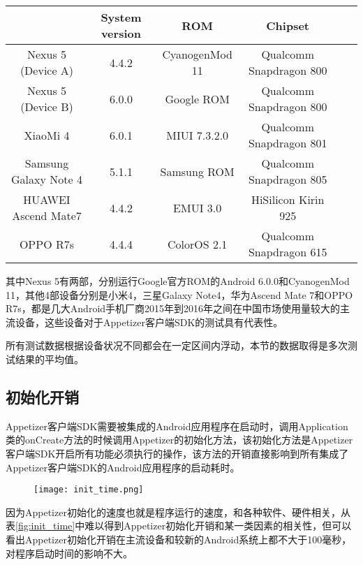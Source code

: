 \begin{table}[!hpb]
	\centering
	\begin{tabular}{c c c c c c} \toprule
		& System version & ROM & Chipset \\ \midrule
		Nexus 5 (Device A) & 4.4.2 & CyanogenMod 11 & Qualcomm Snapdragon 800 \\
		Nexus 5 (Device B) & 6.0.0 & Google ROM & Qualcomm Snapdragon 800 \\
		XiaoMi 4 & 6.0.1 & MIUI 7.3.2.0  & Qualcomm Snapdragon 801 \\
		Samsung Galaxy Note 4 & 5.1.1 & Samsung ROM & Qualcomm Snapdragon 805 \\
		HUAWEI Ascend Mate7 & 4.4.2 & EMUI 3.0 & HiSilicon Kirin 925 \\
		OPPO R7s & 4.4.4 & ColorOS 2.1 & Qualcomm Snapdragon 615 \\ \bottomrule
	\end{tabular}
\end{table}

其中Nexus 5有两部，分别运行Google官方ROM的Android 6.0.0和CyanogenMod 11，其他4部设备分别是小米4，三星Galaxy Note4，华为Ascend Mate 7和OPPO R7s，都是几大Android手机厂商2015年到2016年之间在中国市场使用量较大的主流设备，这些设备对于Appetizer客户端SDK的测试具有代表性。

所有测试数据根据设备状况不同都会在一定区间内浮动，本节的数据取得是多次测试结果的平均值。

\subsection{初始化开销}
\label{subsec:init_cost}

Appetizer客户端SDK需要被集成的Android应用程序在启动时，调用Application类的onCreate方法的时候调用Appetizer的初始化方法，该初始化方法是Appetizer客户端SDK开启所有功能必须执行的操作，该方法的开销直接影响到所有集成了Appetizer客户端SDK的Android应用程序的启动耗时。

\begin{figure}[!htp]
	\centering
	\texttt{[image: init\_time.png]}
\end{figure}

因为Appetizer初始化的速度也就是程序运行的速度，和各种软件、硬件相关，从表\ref{fig:init_time}中难以得到Appetizer初始化开销和某一类因素的相关性，但可以看出Appetizer初始化开销在主流设备和较新的Android系统上都不大于100毫秒，对程序启动时间的影响不大。

